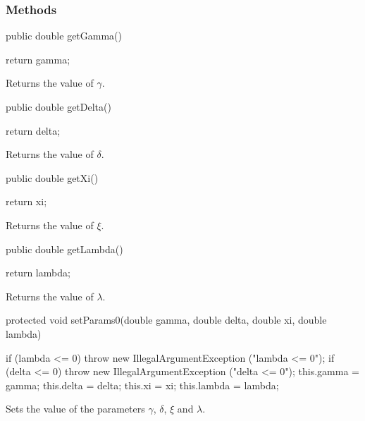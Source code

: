 \subsubsection* {Methods}
\begin{code}

   public double getGamma()\begin{hide} {
      return gamma;
   }\end{hide}
\end{code}
  \begin{tabb}
  Returns the value of $\gamma$.
 \end{tabb}
\begin{code}

   public double getDelta()\begin{hide} {
      return delta;
   }\end{hide}
\end{code}
  \begin{tabb}
  Returns the value of $\delta$.
 \end{tabb}
\begin{code}

   public double getXi()\begin{hide} {
      return xi;
   }\end{hide}
\end{code}
  \begin{tabb}
  Returns the value of $\xi$.
 \end{tabb}
\begin{code}

   public double getLambda()\begin{hide} {
      return lambda;
   }
\end{hide}
\end{code}
  \begin{tabb}
  Returns the value of $\lambda$.
 \end{tabb}
\begin{code}

   protected void setParams0(double gamma, double delta, double xi,
                             double lambda)\begin{hide} {
      if (lambda <= 0)
         throw new IllegalArgumentException ("lambda <= 0");
      if (delta <= 0)
         throw new IllegalArgumentException ("delta <= 0");
      this.gamma = gamma;
      this.delta = delta;
      this.xi = xi;
      this.lambda = lambda;
   }\end{hide}
\end{code}
  \begin{tabb}
  Sets the value of the parameters $\gamma$, $\delta$, $\xi$ and
  $\lambda$.
 \end{tabb}
